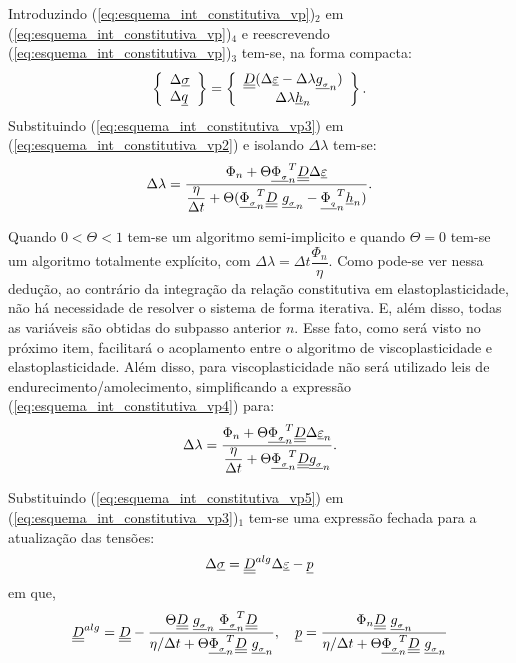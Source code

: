 Introduzindo (\ref{eq:esquema_int_constitutiva_vp})$_2$ em (\ref{eq:esquema_int_constitutiva_vp})$_4$ e reescrevendo (\ref{eq:esquema_int_constitutiva_vp})$_3$ tem-se, na forma compacta:
\begin{equation}
	\label{eq:esquema_int_constitutiva_vp3}
	\left\{ \begin{array}{lcl} \Delta \underline \sigma \\ \Delta \underline q \end{array} \right\} = \left\{ \begin{array}{ccc} \underline{\underline D}(\Delta\underline{\varepsilon} -\Delta \lambda \underline{g_{_\sigma}}_n) \\ \Delta \lambda \underline h_n \end{array} \right\}.
\end{equation}
Substituindo (\ref{eq:esquema_int_constitutiva_vp3}) em (\ref{eq:esquema_int_constitutiva_vp2}) e isolando $\Delta \lambda$ tem-se:
\begin{equation}
	\label{eq:esquema_int_constitutiva_vp4}
	\Delta \lambda = \dfrac{\Phi_n + \Theta \underline{\Phi_{_\sigma}}_n^T\underline{\underline D}\Delta\underline{\varepsilon}}{\dfrac{\eta}{\Delta t} + \Theta (\underline{\Phi_{_\sigma}}_n^T\underline{\underline D}~\underline{g_{_\sigma}}_n - \underline{\Phi_{_q}}_n^T \underline h_n)}.
\end{equation}

Quando $0 < \Theta < 1$  tem-se um algoritmo semi-implicito e quando $\Theta = 0$ tem-se um algoritmo totalmente explícito, com $\Delta \lambda = \Delta t \dfrac{\Phi_n}{\eta}$. Como pode-se ver nessa dedução, ao contrário da integração da relação constitutiva em elastoplasticidade, não há necessidade de resolver o sistema de forma iterativa. E, além disso, todas as variáveis são obtidas do subpasso anterior $n$. Esse fato, como será visto no próximo item, facilitará o acoplamento entre o algoritmo de viscoplasticidade e elastoplasticidade. Além disso, para viscoplasticidade não será utilizado leis de endurecimento/amolecimento, simplificando a expressão (\ref{eq:esquema_int_constitutiva_vp4}) para:
\begin{equation}
	\label{eq:esquema_int_constitutiva_vp5}
	\Delta \lambda = \dfrac{\Phi_n + \Theta \underline{\Phi_{_\sigma}}_n^T\underline{\underline D}\Delta\underline{\varepsilon}_n}{\dfrac{\eta}{\Delta t} + \Theta \underline{\Phi_{_\sigma}}_n^T\underline{\underline D}\underline{g_{_\sigma}}_n}.
\end{equation}

Substituindo (\ref{eq:esquema_int_constitutiva_vp5}) em (\ref{eq:esquema_int_constitutiva_vp3})$_1$ tem-se uma expressão fechada para a atualização das tensões:
\begin{equation}
	\label{eq:esquema_int_constitutiva_vp6}
	\Delta \underline \sigma = \underline{\underline D}^{alg} \Delta \underline{\varepsilon} - \underline p
\end{equation}
em que,
\begin{equation}
	\label{eq:esquema_int_constitutiva_vp6}
	\underline{\underline D}^{alg} = \underline{\underline D} - \dfrac{\Theta \underline{\underline D}~\underline{g_{_\sigma}}_n~\underline{\Phi_{_\sigma}}_n^T \underline{\underline D}}{\eta/\Delta t+ \Theta \underline{\Phi_{_\sigma}}_n^T\underline{\underline D}~\underline{g_{_\sigma}}_n},~~~\underline p = \dfrac{\Phi_n \underline{\underline D} ~\underline{g_{_\sigma}}_n}{\eta/\Delta t+ \Theta \underline{\Phi_{_\sigma}}_n^T\underline{\underline D}~\underline{g_{_\sigma}}_n}
\end{equation}

